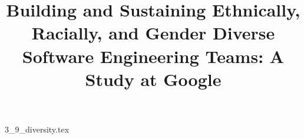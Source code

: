 \documentclass{article}      %
\title{Building and Sustaining Ethnically, Racially, and Gender Diverse Software Engineering Teams: A Study at Google}  %
\begin{document}

\maketitle                   %



{3_9_diversity.tex}
\printbibliography
\end{document}
